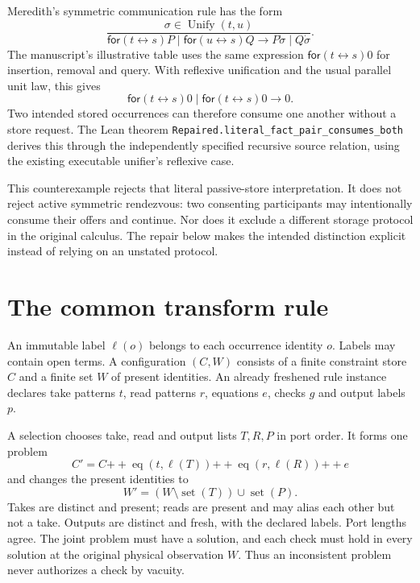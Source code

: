 \documentclass[11pt]{article}
\newcommand{\code}[1]{\texttt{\small #1}}
\begin{document}
Meredith's symmetric communication rule has the form
\[
 \frac{\sigma\in\operatorname{Unify}(t,u)}
 {\mathsf{for}(t\leftrightarrow s)P\mid
  \mathsf{for}(u\leftrightarrow s)Q
  \longrightarrow P\dot\sigma\mid Q\dot\sigma}.
\]
The manuscript's illustrative table uses the same expression
$\mathsf{for}(t\leftrightarrow s)0$ for insertion, removal and query.
With reflexive unification and the usual parallel unit law, this gives
\[
 \mathsf{for}(t\leftrightarrow s)0\mid
 \mathsf{for}(t\leftrightarrow s)0\longrightarrow 0.
\]
Two intended stored occurrences can therefore consume one another without
a store request. The Lean theorem
\code{Repaired.literal\_fact\_pair\_consumes\_both}
derives this through the independently specified recursive source relation,
using the existing executable unifier's reflexive case.

This counterexample rejects that literal passive-store interpretation.
It does not reject active symmetric rendezvous: two consenting participants
may intentionally consume their offers and continue. Nor does it exclude a
different storage protocol in the original calculus. The repair below makes
the intended distinction explicit instead of relying on an unstated protocol.

\section{The common transform rule}

An immutable label $\ell(o)$ belongs to each occurrence identity $o$.
Labels may contain open terms. A configuration $(C,W)$ consists of a finite
constraint store $C$ and a finite set $W$ of present identities. An already
freshened rule instance declares take patterns $t$, read patterns $r$,
equations $e$, checks $g$ and output labels $p$.

A selection chooses take, read and output lists $T,R,P$ in port order.
It forms one problem
\[
 C'=C\mathbin{+\!+}\operatorname{eq}(t,\ell(T))
       \mathbin{+\!+}\operatorname{eq}(r,\ell(R))
       \mathbin{+\!+}e
\]
and changes the present identities to
\[
 W'=(W\setminus\operatorname{set}(T))\cup\operatorname{set}(P).
\]
Takes are distinct and present; reads are present and may alias each other
but not a take. Outputs are distinct and fresh, with the declared labels.
Port lengths agree. The joint problem must have a solution, and each check
must hold in every solution at the original physical observation $W$.
Thus an inconsistent problem never authorizes a check by vacuity.
\end{document}
